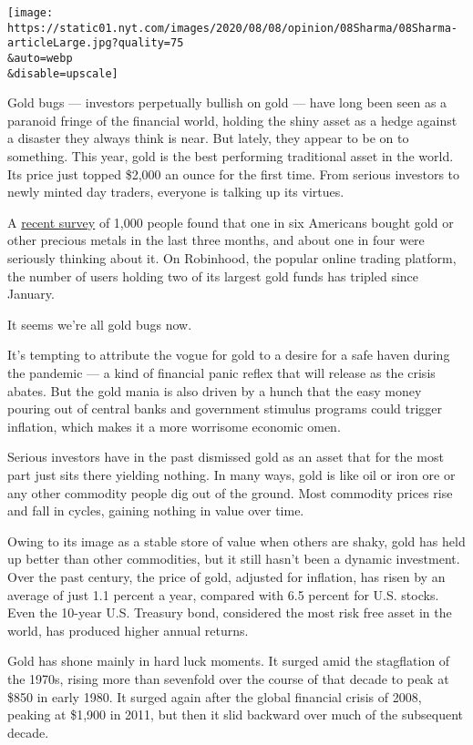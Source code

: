 \texttt{[image: https://static01.nyt.com/images/2020/08/08/opinion/08Sharma/08Sharma-articleLarge.jpg?quality=75\\\&auto=webp\\\&disable=upscale]}

Gold bugs --- investors perpetually bullish on gold --- have long been
seen as a paranoid fringe of the financial world, holding the shiny
asset as a hedge against a disaster they always think is near. But
lately, they appear to be on to something. This year, gold is the best
performing traditional asset in the world. Its price just topped \$2,000
an ounce for the first time. From serious investors to newly minted day
traders, everyone is talking up its virtues.

A
\href{https://www.magnifymoney.com/blog/news/gold-and-cryptocurrency-gain-popularity-amid-covid-19/}{recent
survey} of 1,000 people found that one in six Americans bought gold or
other precious metals in the last three months, and about one in four
were seriously thinking about it. On Robinhood, the popular online
trading platform, the number of users holding two of its largest gold
funds has tripled since January.

It seems we're all gold bugs now.

It's tempting to attribute the vogue for gold to a desire for a safe
haven during the pandemic --- a kind of financial panic reflex that will
release as the crisis abates. But the gold mania is also driven by a
hunch that the easy money pouring out of central banks and government
stimulus programs could trigger inflation, which makes it a more
worrisome economic omen.

Serious investors have in the past dismissed gold as an asset that for
the most part just sits there yielding nothing. In many ways, gold is
like oil or iron ore or any other commodity people dig out of the
ground. Most commodity prices rise and fall in cycles, gaining nothing
in value over time.

Owing to its image as a stable store of value when others are shaky,
gold has held up better than other commodities, but it still hasn't been
a dynamic investment. Over the past century, the price of gold, adjusted
for inflation, has risen by an average of just 1.1 percent a year,
compared with 6.5 percent for U.S. stocks. Even the 10-year U.S.
Treasury bond, considered the most risk free asset in the world, has
produced higher annual returns.

Gold has shone mainly in hard luck moments. It surged amid the
stagflation of the 1970s, rising more than sevenfold over the course of
that decade to peak at \$850 in early 1980. It surged again after the
global financial crisis of 2008, peaking at \$1,900 in 2011, but then it
slid backward over much of the subsequent decade.

